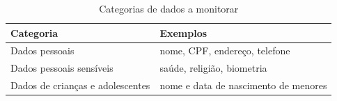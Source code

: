 \begin{table}[htb]
  \caption{Categorias de dados a monitorar}
  \label{tab:categorias-dados}
  \centering
  \begin{tabular}{ll}
    \toprule
    \textbf{Categoria} & \textbf{Exemplos} \\
    \midrule
    Dados pessoais           & nome, CPF, endereço, telefone \\
    Dados pessoais sensíveis & saúde, religião, biometria \\
    Dados de crianças e adolescentes & nome e data de nascimento de menores \\
    \bottomrule
  \end{tabular}
\end{table}
